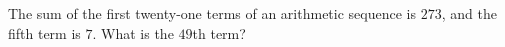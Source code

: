 The sum of the first twenty-one terms of an arithmetic sequence is $273$, and the fifth term is $7$. What is the $49$th term?
